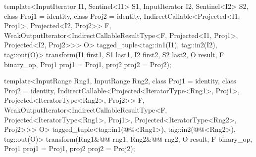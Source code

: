 \begin{addedblock}
\begin{itemdecl}
template<InputIterator I1, Sentinel<I1> S1, InputIterator I2, Sentinel<I2> S2,
    class Proj1 = identity, class Proj2 = identity,
    IndirectCallable<Projected<I1, Proj1>, Projected<I2, Proj2>> F,
    WeakOutputIterator<IndirectCallableResultType<F, Projected<I1, Proj1>,
      Projected<I2, Proj2>>> O>
  tagged_tuple<tag::in1(I1), tag::in2(I2), tag::out(O)>
    transform(I1 first1, S1 last1, I2 first2, S2 last2, O result,
              F binary_op, Proj1 proj1 = Proj1{}, proj2 proj2 = Proj2{});

template<InputRange Rng1, InputRange Rng2,
    class Proj1 = identity, class Proj2 = identity,
    IndirectCallable<Projected<IteratorType<Rng1>, Proj1>,
      Projected<IteratorType<Rng2>, Proj2>> F,
    WeakOutputIterator<IndirectCallableResultType<F,
      Projected<IteratorType<Rng1>, Proj1>, Projected<IteratorType<Rng2>, Proj2>>> O>
  tagged_tuple<tag::in1(@@<Rng1>),
               tag::in2(@@<Rng2>),
               tag::out(O)>
    transform(Rng1&@\newtxt{\&}@ rng1, Rng2&@\newtxt{\&}@ rng2, O result,
              F binary_op, Proj1 proj1 = Proj1{}, proj2 proj2 = Proj2{});
\end{itemdecl}
\end{addedblock}

